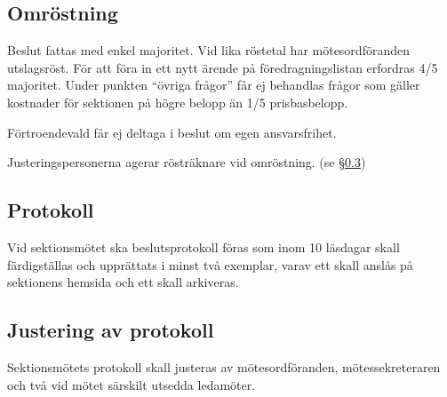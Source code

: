 \documentclass{datateknologsektionen-document}
\begin{document}
    \subsection{Omröstning}
      Beslut fattas med enkel majoritet. Vid lika röstetal har mötesordföranden utslagsröst.
      För att föra in ett nytt ärende på föredragningslistan erfordras 4/5 majoritet. Under
      punkten ``övriga frågor'' får ej behandlas frågor som gäller kostnader för sektionen på
      högre belopp än 1/5 prisbasbelopp.

      Förtroendevald får ej deltaga i beslut om egen ansvarsfrihet.

      Justeringspersonerna agerar rösträknare vid omröstning. (se \S \ref{justeringavprotokoll})
    \subsection{Protokoll}
      Vid sektionsmötet ska beslutsprotokoll föras som inom 10 läsdagar skall färdigställas
      och upprättats i minst två exemplar, varav ett skall anslås på sektionens hemsida och ett
      skall arkiveras.
    \subsection{Justering av protokoll}
      \label{justeringavprotokoll}
      Sektionsmötets protokoll skall justeras av mötesordföranden, mötessekreteraren och två
      vid mötet särskilt utsedda ledamöter.
\end{document}
